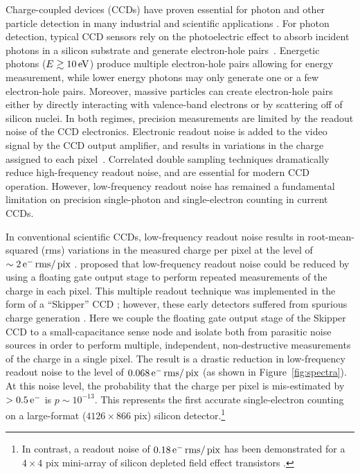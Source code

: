 \documentclass[aps,prl,reprint,superscriptaddress,floatfix,nofootinbib,showkeys,showpacs,preprintnumbers]{revtex4-1}
\begin{document}
Charge-coupled devices (CCDs) have proven essential for photon and other particle detection in many industrial and scientific applications \cite[\eg][]{Boyle:1970,Amelio:1970,damerell:1981,Janesick:2001}.
For photon detection, typical CCD sensors rely on the photoelectric effect to absorb incident photons in a silicon substrate and generate electron-hole pairs~\cite{Amelio:1970}.  
Energetic photons ($E \gtrsim 10 \mathrm{\,eV}$) produce multiple electron-hole pairs allowing for energy measurement, while lower energy photons may only generate one or a few electron-hole pairs. 
Moreover, massive particles can create electron-hole pairs either by directly interacting with valence-band electrons or by scattering off of silicon nuclei.
In both regimes, precision measurements are limited by the readout noise of the CCD electronics.
Electronic readout noise is added to the video signal by the CCD output amplifier, and results in variations in the charge assigned to each pixel~\cite{Janesick:2001}.
Correlated double sampling techniques \cite{CDS:1050448} dramatically reduce high-frequency readout noise, and are essential for modern CCD operation.
However, low-frequency readout noise has remained a fundamental limitation on precision single-photon and single-electron counting in current CCDs. 

In conventional scientific CCDs, low-frequency readout noise results in root-mean-squared (rms) variations in the measured charge per pixel at the level of $\sim 2 \mathrm{\,e^{-}} \mathrm{\,rms}/\mathrm{\,pix}$ \cite[\eg][and references therein]{Janesick:2016,Bebek:2017}. 
\citet{Janesick:1990} proposed that low-frequency readout noise could be reduced by using a floating gate output stage \citep{Wen:1974} to perform repeated measurements of the charge in each pixel.
This multiple readout technique was implemented in the form of a ``Skipper'' CCD \cite{Janesick:1990,Chandler:1990}; however, these early detectors suffered from spurious charge generation \citep{Moroni:2012}.
Here we couple the floating gate output stage of the Skipper CCD to a small-capacitance sense node and isolate both from parasitic noise sources in order to perform multiple, independent, non-destructive measurements of the charge in a single pixel. 
The result is a drastic reduction in low-frequency readout noise to the level of $0.068 \mathrm{\,e^{-}} \mathrm{\,rms}/\mathrm{\,pix}$ (as shown in Figure~\ref{fig:spectra}).
At this noise level, the probability that the charge per pixel is mis-estimated by $>0.5\mathrm{\,e^{-}}$ is $p \sim 10^{-13}$.
This represents the first accurate single-electron counting on a large-format ($4126 \times 866$ pix) silicon detector.\footnote{In contrast, a readout noise of $0.18 \mathrm{\,e^{-}} \mathrm{\,rms}/\mathrm{\,pix}$ has been demonstrated for a $4 \times 4$ pix mini-array of silicon depleted field effect transistors \citep{Lutz:2016}.}
\end{document}
